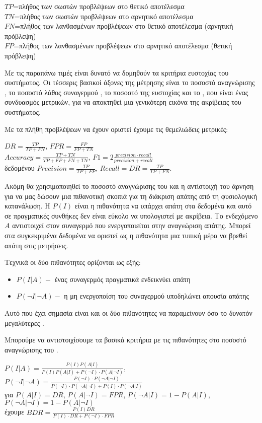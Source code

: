 \begin{center}
$TP$=πλήθος των σωστών προβλέψεων στο θετικό αποτέλεσμα\\
$TN$=πλήθος των σωστών προβλέψεων στο αρνητικό αποτέλεσμα\\
$FN$=πλήθος των λανθασμένων προβλέψεων στο θετικό αποτέλεσμα (αρνητική πρόβλεψη)\\
$FP$=πλήθος των λανθασμένων προβλέψεων στο αρνητικό αποτέλεσμα (θετική πρόβλεψη)\\
\end{center}
\par Με τις παραπάνω τιμές είναι δυνατό να δομηθούν τα κριτήρια ευστοχίας του συστήματος. Οι τέσσερις βασικοί άξονες της μέτρησης είναι το ποσοστό αναγνώρισης , το ποσοστό λάθος συναγερμού , το ποσοστό της ευστοχίας  και το , που είναι ένας συνδυασμός μετρικών, για να αποκτηθεί μια γενικότερη εικόνα της ακρίβειας του συστήματος.\par
Με τα πλήθη προβλέψεων να έχουν οριστεί έχουμε τις θεμελιώδεις μετρικές:
\begin{center}
$DR=\frac{TP}{TP+FN}$, $FPR=\frac{FP}{FP+TN}$\\ 
$Accuracy=\frac{TP+TN}{TP+FP+FN+TN}$, $F1=2\frac{precision \cdotp recall}{precision + recall}$\\
δεδομένου $Precision=\frac{TP}{TP + FP}$, $Recall=DR=\frac{TP}{TP + FN}$.
\end{center}
\par Ακόμη θα χρησιμοποιηθεί το ποσοστό αναγνώρισης του  και η αντίστοιχή του άρνηση για να μας δώσουν μια πιθανοτική σκοπιά για τη διάκριση απάτης από τη φυσιολογική κατανάλωση. Η $P(I)$ είναι η πιθανότητα να υπάρχει απάτη στα δεδομένα και αυτό σε πραγματικές συνθήκες δεν είναι εύκολο να υπολογιστεί με ακρίβεια. Το ενδεχόμενο $A$ αντιστοιχεί στον συναγερμό που ενεργοποιείται στην αναγνώριση απάτης. Μπορεί στα συγκεκριμένα δεδομένα να οριστεί ως η πιθανότητα μια τυπική μέρα να βρεθεί απάτη στις μετρήσεις.\par
Τεχνικά οι δύο πιθανότητες ορίζονται ως εξής:
\begin{itemize}
\item $P(I|A)-$ ένας συναγερμός πραγματικά ενδεικνύει απάτη
\item $P(\neg{I}|\neg{A})-$ η μη ενεργοποίση του συναγερμού υποδηλώνει απουσία απάτης
\end{itemize}
Αυτό που έχει σημασία είναι και οι δύο πιθανότητες να παραμείνουν όσο το δυνατόν μεγαλύτερες \cite{propab}.\par
Μπορούμε να αντιστοιχίσουμε τα βασικά κριτήρια με τις πιθανότητες στο ποσοστό αναγνώρισης του .
\begin{center}
$P(I|A)=\frac{P(I)P(A|I)}{P(I)P(A|I)+P(\neg{I}) \cdotp P(A|\neg{I})}$, 
$P(\neg{I}|\neg{A})=\frac{P(\neg{I}) \cdotp P(\neg{A}|\neg{I})}{P(\neg{I}) \cdotp P(\neg{A}|\neg{I})+P(I) \cdotp P(\neg{A}|I)}$\\
για $P(A|I)=DR$, $P(A|\neg{I})=FPR$, $P(\neg{A}|I)=1-P(A|I)$, $P(\neg{A}|\neg{I})=1-P(A|\neg{I})$\\
έχουμε
$BDR=\frac{P(I)DR}{P(I) \cdotp DR+P(\neg{I}) \cdotp FPR}$\\
\end{center}
